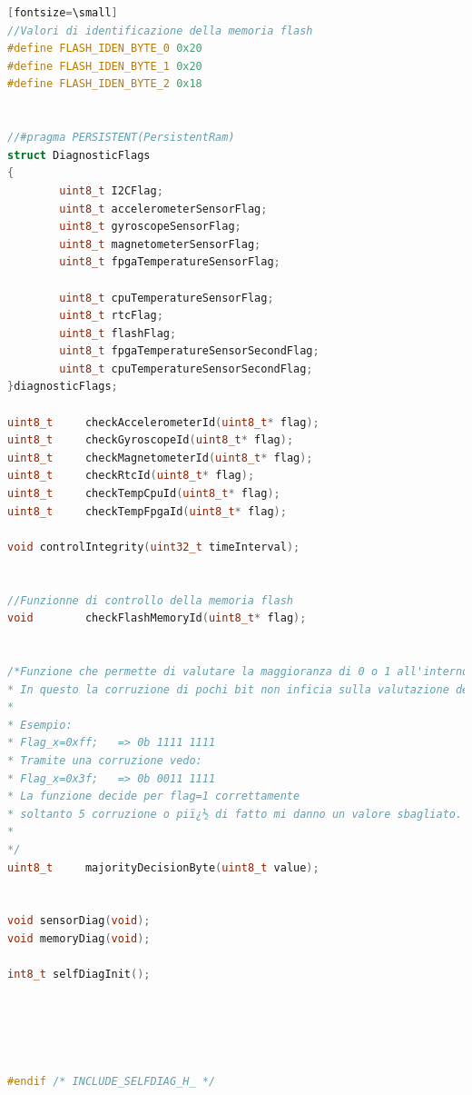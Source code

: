 \documentclass[LaM,binding=0.6cm]{../sapthesis}
\begin{document}
\begin{lstlisting}[language=c][fontsize=\small]
//Valori di identificazione della memoria flash
#define FLASH_IDEN_BYTE_0 0x20
#define FLASH_IDEN_BYTE_1 0x20
#define FLASH_IDEN_BYTE_2 0x18


//#pragma PERSISTENT(PersistentRam)
struct DiagnosticFlags
{
        uint8_t I2CFlag;                           
        uint8_t accelerometerSensorFlag;
        uint8_t gyroscopeSensorFlag;
        uint8_t magnetometerSensorFlag;
        uint8_t fpgaTemperatureSensorFlag;

        uint8_t cpuTemperatureSensorFlag;
        uint8_t rtcFlag;
        uint8_t flashFlag;
        uint8_t fpgaTemperatureSensorSecondFlag;
        uint8_t cpuTemperatureSensorSecondFlag;		
}diagnosticFlags;

uint8_t     checkAccelerometerId(uint8_t* flag);
uint8_t     checkGyroscopeId(uint8_t* flag);
uint8_t     checkMagnetometerId(uint8_t* flag);
uint8_t     checkRtcId(uint8_t* flag);
uint8_t     checkTempCpuId(uint8_t* flag);
uint8_t     checkTempFpgaId(uint8_t* flag);

void controlIntegrity(uint32_t timeInterval);


//Funzionne di controllo della memoria flash
void        checkFlashMemoryId(uint8_t* flag);


/*Funzione che permette di valutare la maggioranza di 0 o 1 all'interno di un byte.
* In questo la corruzione di pochi bit non inficia sulla valutazione del valore della flag
*
* Esempio:
* Flag_x=0xff;   => 0b 1111 1111
* Tramite una corruzione vedo:
* Flag_x=0x3f;   => 0b 0011 1111
* La funzione decide per flag=1 correttamente
* soltanto 5 corruzione o piï¿½ di fatto mi danno un valore sbagliato.
*
*/
uint8_t     majorityDecisionByte(uint8_t value);


void sensorDiag(void);
void memoryDiag(void);

int8_t selfDiagInit();





#endif /* INCLUDE_SELFDIAG_H_ */
\end{lstlisting}
\end{document}

